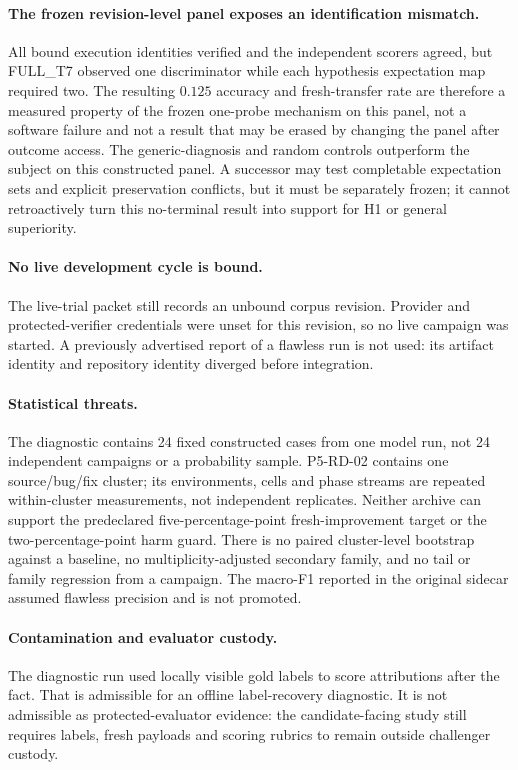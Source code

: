 \paragraph{The frozen revision-level panel exposes an identification mismatch.}
All bound execution identities verified and the independent scorers agreed,
but FULL\_T7 observed one discriminator while each hypothesis expectation map
required two. The resulting $0.125$ accuracy and fresh-transfer rate are
therefore a measured property of the frozen one-probe mechanism on this panel,
not a software failure and not a result that may be erased by changing the
panel after outcome access. The generic-diagnosis and random controls outperform
the subject on this constructed panel. A successor may test completable
expectation sets and explicit preservation conflicts, but it must be separately
frozen; it cannot retroactively turn this no-terminal result into support for
H1 or general superiority.

\paragraph{No live development cycle is bound.}
The live-trial packet still records an unbound corpus revision. Provider and protected-verifier credentials were unset for this revision, so no live campaign was started. A previously advertised report of a flawless run is not used: its artifact identity and repository identity diverged before integration.

\paragraph{Statistical threats.}
The diagnostic contains 24 fixed constructed cases from one model run, not 24
independent campaigns or a probability sample. P5-RD-02 contains one
source/bug/fix cluster; its environments, cells and phase streams are repeated
within-cluster measurements, not independent replicates. Neither archive can
support the predeclared five-percentage-point fresh-improvement target or the
two-percentage-point harm guard. There is no paired cluster-level bootstrap
against a baseline, no multiplicity-adjusted secondary family, and no tail or
family regression from a campaign. The macro-F1 reported in the original
sidecar assumed flawless precision and is not promoted.

\paragraph{Contamination and evaluator custody.}
The diagnostic run used locally visible gold labels to score attributions after the fact. That is admissible for an offline label-recovery diagnostic. It is not admissible as protected-evaluator evidence: the candidate-facing study still requires labels, fresh payloads and scoring rubrics to remain outside challenger custody.
